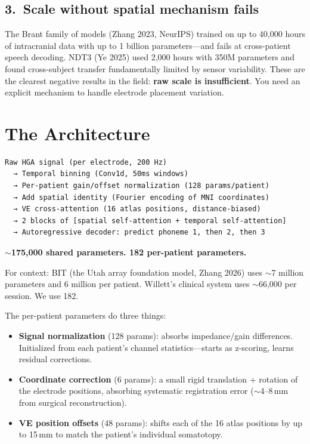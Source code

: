 \documentclass[11pt,letterpaper]{article}
\begin{document}
\subsection*{3.~Scale without spatial mechanism fails}

The Brant family of models (Zhang 2023, NeurIPS) trained on up to 40,000 hours of intracranial data with up to 1 billion parameters---and fails at cross-patient speech decoding. NDT3 (Ye 2025) used 2,000 hours with 350M parameters and found cross-subject transfer fundamentally limited by sensor variability. These are the clearest negative results in the field: \textbf{raw scale is insufficient}. You need an explicit mechanism to handle electrode placement variation.


\section{The Architecture}

\begin{Verbatim}[frame=single, fontsize=\small]
Raw HGA signal (per electrode, 200 Hz)
  → Temporal binning (Conv1d, 50ms windows)
  → Per-patient gain/offset normalization (128 params/patient)
  → Add spatial identity (Fourier encoding of MNI coordinates)
  → VE cross-attention (16 atlas positions, distance-biased)
  → 2 blocks of [spatial self-attention + temporal self-attention]
  → Autoregressive decoder: predict phoneme 1, then 2, then 3
\end{Verbatim}

\textbf{${\sim}$175,000 shared parameters. 182 per-patient parameters.}

For context: BIT (the Utah array foundation model, Zhang 2026) uses ${\sim}$7 million parameters and 6 million per patient. Willett's clinical system uses ${\sim}$66,000 per session. We use 182.

The per-patient parameters do three things:

\begin{itemize}[leftmargin=2em]
    \item \textbf{Signal normalization} (128 params): absorbs impedance/gain differences. Initialized from each patient's channel statistics---starts as z-scoring, learns residual corrections.
    \item \textbf{Coordinate correction} (6 params): a small rigid translation + rotation of the electrode positions, absorbing systematic registration error (${\sim}$4--8\,mm from surgical reconstruction).
    \item \textbf{VE position offsets} (48 params): shifts each of the 16 atlas positions by up to 15\,mm to match the patient's individual somatotopy.
\end{itemize}
\end{document}
